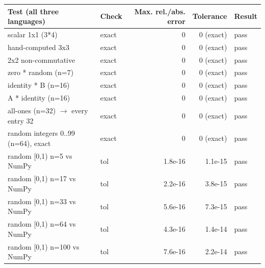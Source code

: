 \begin{tabular}{llrrl}
\toprule
Test (all three languages) & Check & Max. rel./abs. error & Tolerance & Result \\
\midrule
scalar 1x1 (3*4) & exact & 0 & 0 (exact) & pass \\
hand-computed 3x3 & exact & 0 & 0 (exact) & pass \\
2x2 non-commutative & exact & 0 & 0 (exact) & pass \\
zero * random (n=7) & exact & 0 & 0 (exact) & pass \\
identity * B (n=16) & exact & 0 & 0 (exact) & pass \\
A * identity (n=16) & exact & 0 & 0 (exact) & pass \\
all-ones (n=32) $\rightarrow$ every entry 32 & exact & 0 & 0 (exact) & pass \\
random integers 0..99 (n=64), exact & exact & 0 & 0 (exact) & pass \\
random [0,1) n=5 vs NumPy & tol & 1.8e-16 & 1.1e-15 & pass \\
random [0,1) n=17 vs NumPy & tol & 2.2e-16 & 3.8e-15 & pass \\
random [0,1) n=33 vs NumPy & tol & 5.6e-16 & 7.3e-15 & pass \\
random [0,1) n=64 vs NumPy & tol & 4.3e-16 & 1.4e-14 & pass \\
random [0,1) n=100 vs NumPy & tol & 7.6e-16 & 2.2e-14 & pass \\
\bottomrule
\end{tabular}
